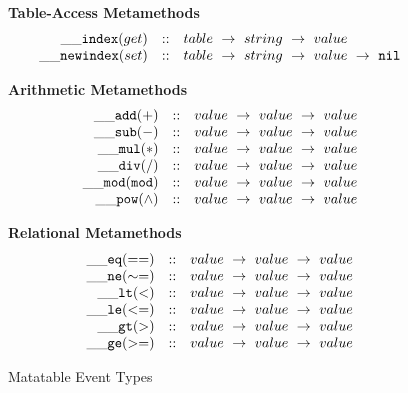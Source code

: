 \documentclass{article}
\begin{document}
\begin{figure}[P]
\caption{Matatable Event Types}
{\bf Table-Access Metamethods}
\label{fig:matatables}
\[
\begin{array}{rclcl}
  {\tt \_\_index}(get) & :: & {table} ~\rightarrow ~ {string} ~\rightarrow ~ {value} \\
  {\tt \_\_newindex}(set)   & :: &  {table} ~\rightarrow ~{string} ~\rightarrow ~{value} ~\rightarrow ~{\tt nil}\\
\end{array}
\]

{\bf Arithmetic Metamethods}
\[
\begin{array}{rclcl}
  {\tt \_\_add(+)}   & :: &  {value} ~\rightarrow ~{value}~\rightarrow ~{value}\\
  {\tt \_\_sub(-)}   & :: &  {value} ~\rightarrow ~{value}~\rightarrow ~{value}\\
  {\tt \_\_mul(*)}   & :: &  {value} ~\rightarrow ~{value}~\rightarrow ~{value}\\
  {\tt \_\_div(/)}   & :: &  {value} ~\rightarrow ~{value}~\rightarrow ~{value}\\
  {\tt \_\_mod(mod)}   & :: &  {value} ~\rightarrow ~{value}~\rightarrow ~{value}\\
  {\tt \_\_pow({\wedge})}   & :: &  {value} ~\rightarrow ~{value}~\rightarrow ~{value}\\
\end{array}
\]

{\bf Relational Metamethods}
\[
\begin{array}{rclcl}
  {\tt \_\_eq(==)} & :: & {value} ~\rightarrow ~ {value} ~\rightarrow ~ {value}\\
  {\tt \_\_ne(\sim=)} & :: & {value} ~\rightarrow ~ {value} ~\rightarrow ~ {value}\\
  {\tt \_\_lt(<)}   & :: &  {value} ~\rightarrow ~{value} ~\rightarrow ~{value}\\
  {\tt \_\_le(<=)}   & :: &  {value} ~\rightarrow ~{value} ~\rightarrow ~{value}\\
  {\tt \_\_gt(>)}   & :: &  {value} ~\rightarrow ~{value} ~\rightarrow ~{value}\\
  {\tt \_\_ge(>=)}   & :: &  {value} ~\rightarrow ~{value} ~\rightarrow ~{value}\\
\end{array}
\]
\end{figure}

\newcommand{\aFunction}[2]{\lambda{#1}.{#2}}
\end{document}
